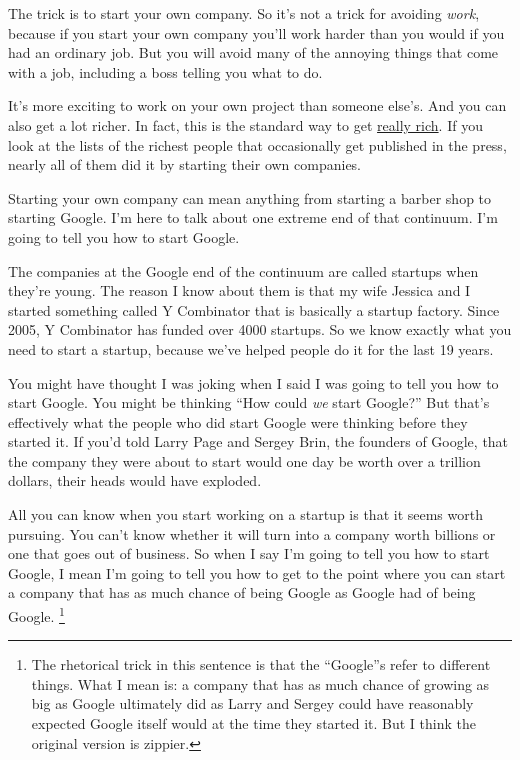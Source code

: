 \documentclass[12pt]{book}
\begin{document}
The trick is to start your own company. So it's not a trick for avoiding
\emph{work}, because if you start your own company you'll work harder
than you would if you had an ordinary job. But you will avoid many of
the annoying things that come with a job, including a boss telling you
what to do.

It's more exciting to work on your own project than someone else's. And
you can also get a lot richer. In fact, this is the standard way to get
\href{richnow.html}{really rich}. If you look at the lists of the
richest people that occasionally get published in the press, nearly all
of them did it by starting their own companies.

Starting your own company can mean anything from starting a barber shop
to starting Google. I'm here to talk about one extreme end of that
continuum. I'm going to tell you how to start Google.

The companies at the Google end of the continuum are called startups
when they're young. The reason I know about them is that my wife Jessica
and I started something called Y Combinator that is basically a startup
factory. Since 2005, Y Combinator has funded over 4000 startups. So we
know exactly what you need to start a startup, because we've helped
people do it for the last 19 years.

You might have thought I was joking when I said I was going to tell you
how to start Google. You might be thinking ``How could \emph{we} start
Google?'' But that's effectively what the people who did start Google
were thinking before they started it. If you'd told Larry Page and
Sergey Brin, the founders of Google, that the company they were about to
start would one day be worth over a trillion dollars, their heads would
have exploded.

All you can know when you start working on a startup is that it seems
worth pursuing. You can't know whether it will turn into a company worth
billions or one that goes out of business. So when I say I'm going to
tell you how to start Google, I mean I'm going to tell you how to get to
the point where you can start a company that has as much chance of being
Google as Google had of being Google. \footnote{The rhetorical trick in this sentence is that the ``Google''s
refer to different things. What I mean is: a company that has as much
chance of growing as big as Google ultimately did as Larry and Sergey
could have reasonably expected Google itself would at the time they
started it. But I think the original version is zippier.}
\end{document}
